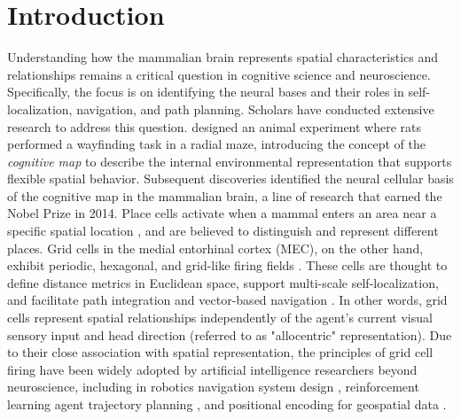 \documentclass[letterpaper]{article} %
\begin{document}
\section{Introduction}
Understanding how the mammalian brain represents spatial characteristics and relationships remains a critical question in cognitive science and neuroscience. Specifically, the focus is on identifying the neural bases and their roles in self-localization, navigation, and path planning. Scholars have conducted extensive research to address this question. \cite{tolman_cognitive_1948} designed an animal experiment where rats performed a wayfinding task in a radial maze, introducing the concept of the \emph{cognitive map} to describe the internal environmental representation that supports flexible spatial behavior. Subsequent discoveries identified the neural cellular basis of the cognitive map in the mammalian brain, a line of research that earned the Nobel Prize in 2014. Place cells activate when a mammal enters an area near a specific spatial location \cite{o1978hippocampus, solstad2006grid}, and are believed to distinguish and represent different places. Grid cells in the medial entorhinal cortex (MEC), on the other hand, exhibit periodic, hexagonal, and grid-like firing fields \cite{hafting2005microstructure}. These cells are thought to define distance metrics in Euclidean space, support multi-scale self-localization, and facilitate path integration and vector-based navigation \cite{gorchetchnikov2007space, moser2008place,banino2018vector}. In other words, grid cells represent spatial relationships independently of the agent’s current visual sensory input and head direction (referred to as "allocentric" representation). Due to their close association with spatial representation, the principles of grid cell firing have been widely adopted by artificial intelligence researchers beyond neuroscience, including in robotics navigation system design \cite{yuan2015entorhinal}, reinforcement learning agent trajectory planning \cite{yu2020prediction}, and positional encoding for geospatial data \cite{mai2020multi, mai2023sphere2vec}.
\end{document}
